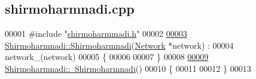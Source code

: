 \hypertarget{shirmoharmnadi_8cpp_source}{}\subsection{shirmoharmnadi.\+cpp}
\label{shirmoharmnadi_8cpp_source}

\begin{DoxyCode}
00001 \textcolor{preprocessor}{#include "\hyperlink{shirmoharmmadi_8h}{shirmoharmmadi.h}"}
00002 
\hypertarget{shirmoharmnadi_8cpp_source_l00003}{}\hyperlink{class_shirmoharmnadi_ad4f137b18ebbf42dfba31b60e0ab0b60}{00003} \hyperlink{class_shirmoharmnadi_ad4f137b18ebbf42dfba31b60e0ab0b60}{Shirmoharmnadi::Shirmoharmnadi}(\hyperlink{class_network}{Network} *network) :
00004   network\_(network)
00005 \{
00006 
00007 \}
00008 
\hypertarget{shirmoharmnadi_8cpp_source_l00009}{}\hyperlink{class_shirmoharmnadi_abcace04460fd4dfbc4f951ce2c7a59f7}{00009} \hyperlink{class_shirmoharmnadi_abcace04460fd4dfbc4f951ce2c7a59f7}{Shirmoharmnadi::~Shirmoharmnadi}()
00010 \{
00011 
00012 \}
00013 
\end{DoxyCode}
